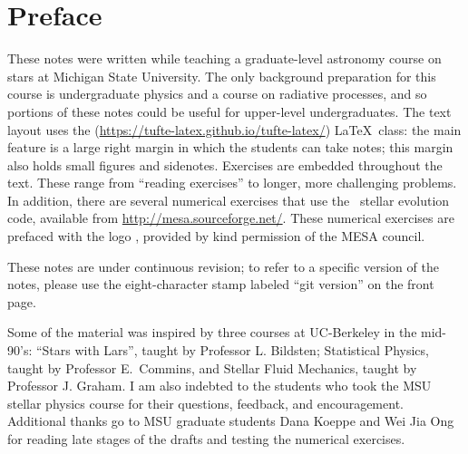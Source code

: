 
\section*{Preface}
These notes were written while teaching a graduate-level astronomy course on stars at Michigan State University.  The only background preparation for this course is undergraduate physics and a course on radiative processes, and so portions of these notes could be useful for upper-level undergraduates.  
The text layout uses the  (\url{https://tufte-latex.github.io/tufte-latex/}) \LaTeX\ class:  the main feature is a large right margin in which the students can take notes; this margin also holds small figures and sidenotes. Exercises are embedded throughout the text.  These range from ``reading exercises'' to longer, more challenging problems.  In addition, there are several numerical exercises that use the \mesa\ stellar evolution code, available from \url{http://mesa.sourceforge.net/}.  These numerical exercises are prefaced with the logo , provided by kind permission of the MESA council.

These notes are under continuous revision; to refer to a specific version of the notes, please use the eight-character stamp labeled ``git version'' on the front page.

Some of the material was inspired by three courses at UC-Berkeley in the mid-90's: ``Stars with Lars'', taught by Professor L. Bildsten; Statistical Physics, taught by Professor E.~Commins, and Stellar Fluid Mechanics, taught by Professor J. Graham.  I am also indebted to the students who took the MSU stellar physics course for their questions, feedback, and encouragement. Additional thanks go to MSU graduate students Dana Koeppe and Wei Jia Ong for reading late stages of the drafts and testing the numerical exercises.
